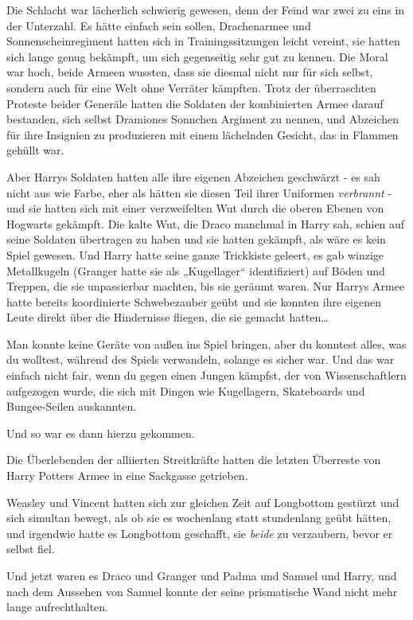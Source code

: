 {Die Schlacht war lächerlich schwierig gewesen, denn der Feind war zwei zu eins in der Unterzahl. Es hätte einfach sein sollen, Drachenarmee und Sonnenscheinregiment hatten sich in Trainingssitzungen leicht vereint, sie hatten sich lange genug bekämpft, um sich gegenseitig sehr gut zu kennen. Die Moral war hoch, beide Armeen wussten, dass sie diesmal nicht nur für sich selbst, sondern auch für eine Welt ohne Verräter kämpften. Trotz der überraschten Proteste beider Generäle hatten die Soldaten der kombinierten Armee darauf bestanden, sich selbst Dramiones Sonnchen Argiment zu nennen, und Abzeichen für ihre Insignien zu produzieren mit einem lächelnden Gesicht, das in Flammen gehüllt war.

Aber Harrys Soldaten hatten alle ihre eigenen Abzeichen geschwärzt - es sah nicht aus wie Farbe, eher als hätten sie diesen Teil ihrer Uniformen \emph{verbrannt} - und sie hatten sich mit einer verzweifelten Wut durch die oberen Ebenen von Hogwarts gekämpft. Die kalte Wut, die Draco manchmal in Harry sah, schien auf seine Soldaten übertragen zu haben und sie hatten gekämpft, als wäre es kein Spiel gewesen. Und Harry hatte seine ganze Trickkiste geleert, es gab winzige Metallkugeln (Granger hatte sie als „Kugellager“ identifiziert) auf Böden und Treppen, die sie unpassierbar machten, bis sie geräumt waren. Nur Harrys Armee hatte bereits koordinierte Schwebezauber geübt und sie konnten ihre eigenen Leute direkt über die Hindernisse fliegen, die sie gemacht hatten…

Man konnte keine Geräte von außen ins Spiel bringen, aber du konntest alles, was du wolltest, während des Spiels verwandeln, solange es sicher war. Und das war einfach nicht fair, wenn du gegen einen Jungen kämpfst, der von Wissenschaftlern aufgezogen wurde, die sich mit Dingen wie Kugellagern, Skateboards und Bungee-Seilen auskannten.

Und so war es dann hierzu gekommen.

Die Überlebenden der alliierten Streitkräfte hatten die letzten Überreste von Harry Potters Armee in eine Sackgasse getrieben.

Weasley und Vincent hatten sich zur gleichen Zeit auf Longbottom gestürzt und sich simultan bewegt, als ob sie es wochenlang statt stundenlang geübt hätten, und irgendwie hatte es Longbottom geschafft, sie \emph{beide} zu verzaubern, bevor er selbst fiel.

Und jetzt waren es Draco und Granger und Padma und Samuel und Harry, und nach dem Aussehen von Samuel konnte der seine prismatische Wand nicht mehr lange aufrechthalten.

}
